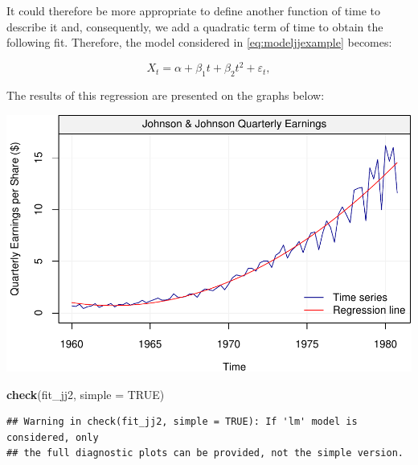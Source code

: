 \documentclass[]{book}
\newenvironment{Shaded}{\begin{snugshade}}{\end{snugshade}}
\newcommand{\DataTypeTok}[1]{\textcolor[rgb]{0.13,0.29,0.53}{#1}}
\newcommand{\KeywordTok}[1]{\textcolor[rgb]{0.13,0.29,0.53}{\textbf{#1}}}
\newcommand{\NormalTok}[1]{#1}
\newcommand{\OtherTok}[1]{\textcolor[rgb]{0.56,0.35,0.01}{#1}}
\theoremstyle{definition}
\theoremstyle{definition}
\theoremstyle{definition}
\theoremstyle{remark}
\begin{document}
It could therefore be more appropriate to define another function of
time to describe it and, consequently, we add a quadratic term of time
to obtain the following fit. Therefore, the model considered in
\eqref{eq:modeljjexample} becomes:

\begin{equation} 
X_t = \alpha + \beta_1 t + \beta_2 t^2 + \varepsilon_t,
\label{eq:modeljjexample2}
\end{equation}

The results of this regression are presented on the graphs below:

\begin{center}\includegraphics{ts_files/figure-latex/unnamed-chunk-16-1} \end{center}

\begin{Shaded}
\begin{Highlighting}[]
\KeywordTok{check}\NormalTok{(fit_jj2, }\DataTypeTok{simple =} \OtherTok{TRUE}\NormalTok{)}
\end{Highlighting}
\end{Shaded}

\begin{verbatim}
## Warning in check(fit_jj2, simple = TRUE): If 'lm' model is considered, only
## the full diagnostic plots can be provided, not the simple version.
\end{verbatim}
\end{document}
